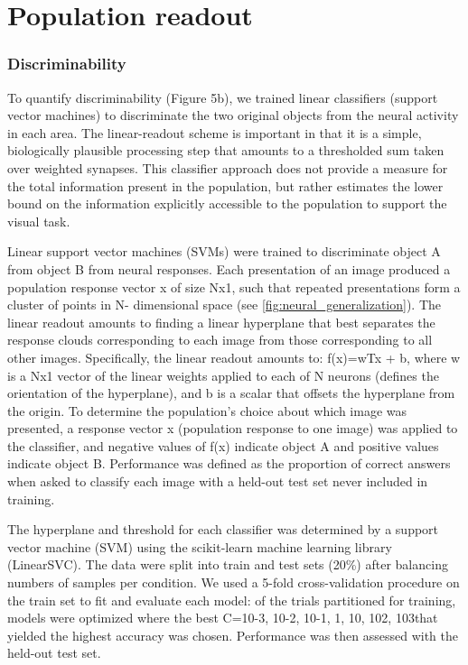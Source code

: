 \section{Population readout}
\subsubsection{Discriminability}
To quantify discriminability (Figure 5b), we trained linear classifiers (support vector machines) to discriminate the two original objects from the neural activity in each area. The linear-readout scheme is important in that it is a simple, biologically plausible processing step that amounts to a thresholded sum taken over weighted synapses. This classifier approach does not provide a measure for the total information present in the population, but rather estimates the lower bound on the information explicitly accessible to the population to support the visual task\cite{Hung2005, Rust2010SelectivityIT}.

Linear support vector machines (SVMs) were trained to discriminate object A from object B from neural responses. Each presentation of an image produced a population response vector x of size Nx1, such that repeated presentations form a cluster of points in N- dimensional space (see \ref{fig:neural_generalization}). The linear readout amounts to finding a linear hyperplane that best separates the response clouds corresponding to each image from those corresponding to all other images. Specifically, the linear readout amounts to: f(x)=wTx + b, where w is a Nx1 vector of the linear weights applied to each of N neurons (defines the orientation of the hyperplane), and b is a scalar that offsets the hyperplane from the origin. To determine the population’s choice about which image was presented, a response vector x (population response to one image) was applied to the classifier, and negative values of f(x) indicate object A and positive values indicate object B. Performance was defined as the proportion of correct answers when asked to classify each image with a held-out test set never included in training. 

The hyperplane and threshold for each classifier was determined by a support vector machine (SVM) using the scikit-learn machine learning library (LinearSVC\cite{Pedregosa2011}). The data were split into train and test sets (20\%) after balancing numbers of samples per condition. We used a 5-fold cross-validation procedure on the train set to fit and evaluate each model:  of the trials partitioned for training, models were optimized where the best C={10-3, 10-2, 10-1, 1, 10, 102, 103}that yielded the highest accuracy was chosen. Performance was then assessed with the held-out test set. 

